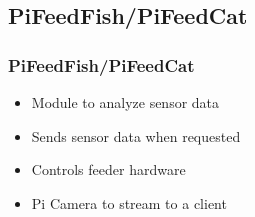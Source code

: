 \documentclass[]{beamer}
\begin{document}
\subsection{PiFeedFish/PiFeedCat}
\begin{frame}
	\frametitle{PiFeedFish/PiFeedCat}
    
    \begin{itemize}
    	\item Module to analyze sensor data
        \item Sends sensor data when requested
        \item Controls feeder hardware
        \item Pi Camera to stream to a client
    \end{itemize}
\end{frame}
\end{document}
